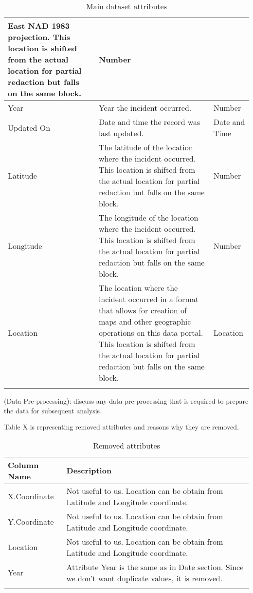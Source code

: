 \begin{center}
\begin{longtable}{|m{6em}|m{18em}|m{7em}|}
            East NAD 1983 projection. This location is shifted from the actual location for 
            partial redaction but falls on the same block. & 
            Number\\
        \hline
            Year & 
            Year the incident occurred. & 
            Number\\
        \hline
            Updated On & 
            Date and time the record was last updated. & 
            Date and Time\\
        \hline
            Latitude & 
            The latitude of the location where the incident occurred. This location is shifted 
            from the actual location for partial redaction but falls on the same block. & 
            Number\\
        \hline
            Longitude & 
            The longitude of the location where the incident occurred. This location is shifted 
            from the actual location for partial redaction but falls on the same block. & 
            Number\\
        \hline
            Location & 
            The location where the incident occurred in a format that allows for creation of 
            maps and other geographic operations on this data portal. This location is shifted 
            from the actual location for partial redaction but falls on the same block. & 
            Location\\
        \hline
    \caption{Main dataset attributes}
\end{longtable}
\end{center}

(Data Pre-processing): discuss any data pre-processing that is required to prepare the data for subsequent analysis. 

Table X is representing removed attributes and reasons why they are removed.

\begin{center}
    \begin{longtable}{|m{10em}|m{21em}|}
        \hline
            Column Name & 
            Description \\
        \hline
            X.Coordinate & 
            Not useful to us. Location can be obtain from Latitude and Longitude coordinate.\\
        \hline
            Y.Coordinate & 
            Not useful to us. Location can be obtain from Latitude and Longitude coordinate.\\
        \hline
            Location & 
            Not useful to us. Location can be obtain from Latitude and Longitude coordinate.\\
        \hline
            Year & 
            Attribute Year is the same as in Date section. Since we don't want duplicate values, it is removed.\\
        \hline
    \caption{Removed attributes}
\end{longtable}
\end{center}

